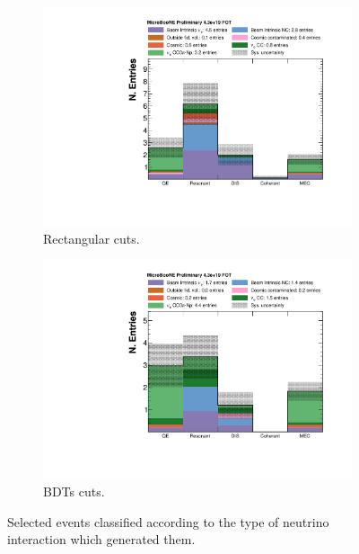 \begin{figure}[htbp]
\centering
  \begin{subfigure}{0.48\textwidth}
    \includegraphics[width=\linewidth]{figures/interaction_type_cuts.pdf}
    \caption{Rectangular cuts.} 
  \end{subfigure}
    \begin{subfigure}{0.48\textwidth}
    \includegraphics[width=\linewidth]{figures/interaction_type_bdt.pdf}
    \caption{BDTs cuts.} 
  \end{subfigure}
  \caption{Selected events classified according to the type of neutrino interaction which generated them.}
  \label{fig:interaction}
\end{figure}